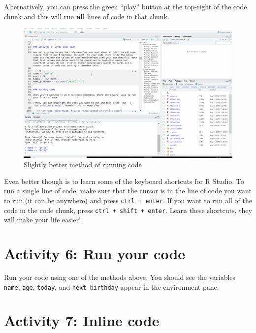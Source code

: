 \documentclass[
  oneside]{book}
\begin{document}
Alternatively, you can press the green ``play'' button at the top-right of the code chunk and this will run \textbf{all} lines of code in that chunk.

\begin{figure}

{\centering \includegraphics[width=1\linewidth]{images/run2} 

}

\caption{Slightly better method of running code}\label{fig:img-run2}
\end{figure}

Even better though is to learn some of the keyboard shortcuts for R Studio. To run a single line of code, make sure that the cursor is in the line of code you want to run (it can be anywhere) and press \texttt{ctrl\ +\ enter}. If you want to run all of the code in the code chunk, press \texttt{ctrl\ +\ shift\ +\ enter}. Learn these shortcuts, they will make your life easier!

\hypertarget{activity-6-run-your-code}{%
\section{Activity 6: Run your code}\label{activity-6-run-your-code}}

Run your code using one of the methods above. You should see the variables \texttt{name}, \texttt{age}, \texttt{today}, and \texttt{next\_birthday} appear in the environment pane.

\hypertarget{activity-7-inline-code}{%
\section{Activity 7: Inline code}\label{activity-7-inline-code}}
\end{document}

